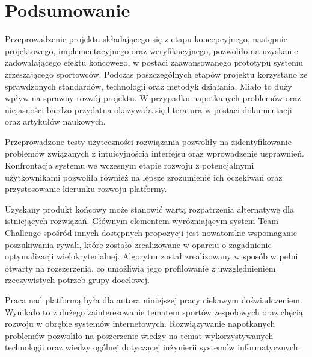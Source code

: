 \chapter{Podsumowanie}

Przeprowadzenie projektu składającego się z etapu koncepcyjnego, następnie projektowego, implementacyjnego oraz weryfikacyjnego, pozwoliło na uzyskanie zadowalającego efektu końcowego, w postaci zaawansowanego prototypu systemu zrzeszającego sportowców. Podczas poszczególnych etapów projektu korzystano ze sprawdzonych standardów, technologii oraz metodyk działania. Miało to duży wpływ na sprawny rozwój projektu. W przypadku napotkanych problemów oraz niejasności bardzo przydatna okazywała się literatura w postaci dokumentacji oraz artykułów naukowych.

Przeprowadzone testy użyteczności rozwiązania pozwoliły na zidentyfikowanie problemów związanych z intuicyjnością interfejsu oraz wprowadzenie usprawnień. Konfrontacja systemu we wczesnym etapie rozwoju z potencjalnymi użytkownikami pozwoliła również na lepsze zrozumienie ich oczekiwań oraz przystosowanie kierunku rozwoju platformy.

Uzyskany produkt końcowy może stanowić wartą rozpatrzenia alternatywę dla istniejących rozwiązań. Głównym elementem wyróżniającym system Team Challenge spośród innych dostępnych propozycji jest nowatorskie wspomaganie poszukiwania rywali, które zostało zrealizowane w oparciu o zagadnienie optymalizacji wielokryterialnej. Algorytm został zrealizowany w sposób w pełni otwarty na rozszerzenia, co umożliwia jego profilowanie z uwzględnieniem rzeczywistych potrzeb grupy docelowej.

Praca nad platformą była dla autora niniejszej pracy ciekawym doświadczeniem. Wynikało to z dużego zainteresowanie tematem sportów zespołowych oraz chęcią rozwoju w obrębie systemów internetowych. Rozwiązywanie napotkanych problemów pozwoliło na poszerzenie wiedzy na temat wykorzystywanych technologii oraz wiedzy ogólnej dotyczącej inżynierii systemów informatycznych.







